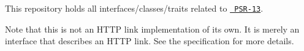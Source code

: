This repository holds all interfaces/classes/traits related to \href{https://github.com/php-fig/fig-standards/blob/master/proposed/links.md}{\texttt{ PSR-\/13}}.

Note that this is not an HTTP link implementation of its own. It is merely an interface that describes an HTTP link. See the specification for more details. 